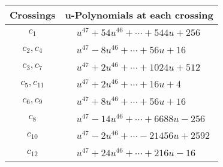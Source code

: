 \documentclass[1p]{elsarticle_modified}
\theoremstyle{definition}
\begin{document}
\begin{tabular}{m{50pt}|m{274pt}}
Crossings & \hspace{64pt}u-Polynomials at each crossing \\
\hline $$\begin{aligned}c_{1}\end{aligned}$$&$\begin{aligned}
&u^{47}+54 u^{46}+\cdots+544 u+256
\end{aligned}$\\
\hline $$\begin{aligned}c_{2},c_{4}\end{aligned}$$&$\begin{aligned}
&u^{47}-8 u^{46}+\cdots+56 u+16
\end{aligned}$\\
\hline $$\begin{aligned}c_{3},c_{7}\end{aligned}$$&$\begin{aligned}
&u^{47}+2 u^{46}+\cdots+1024 u+512
\end{aligned}$\\
\hline $$\begin{aligned}c_{5},c_{11}\end{aligned}$$&$\begin{aligned}
&u^{47}+2 u^{46}+\cdots+16 u+4
\end{aligned}$\\
\hline $$\begin{aligned}c_{6},c_{9}\end{aligned}$$&$\begin{aligned}
&u^{47}+8 u^{46}+\cdots+56 u+16
\end{aligned}$\\
\hline $$\begin{aligned}c_{8}\end{aligned}$$&$\begin{aligned}
&u^{47}-14 u^{46}+\cdots+6688 u-256
\end{aligned}$\\
\hline $$\begin{aligned}c_{10}\end{aligned}$$&$\begin{aligned}
&u^{47}-2 u^{46}+\cdots-21456 u+2592
\end{aligned}$\\
\hline $$\begin{aligned}c_{12}\end{aligned}$$&$\begin{aligned}
&u^{47}+24 u^{46}+\cdots+216 u-16
\end{aligned}$\\
\hline
\end{tabular}\\~\\
\end{document}
